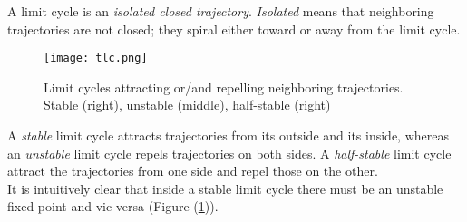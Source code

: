 A limit cycle is an \emph{isolated closed trajectory}.
\emph{Isolated} means that neighboring trajectories are not closed; they spiral either toward or away from the limit cycle.
\begin{figure}[H]
	\centering
	\texttt{[image: tlc.png]}
	\caption{Limit cycles attracting or/and repelling neighboring trajectories. Stable (right), unstable (middle), half-stable (right)}
	\label{fig:tlc}
\end{figure}
A \emph{stable} limit cycle attracts trajectories from its outside and its inside, whereas an \emph{unstable} limit cycle repels trajectories on both sides.
A \emph{half-stable} limit cycle attract the trajectories from one side and repel those on the other.\\
It is intuitively clear that inside a stable limit cycle there must be an unstable fixed point and vic-versa (Figure (\ref{fig:tlc})).
